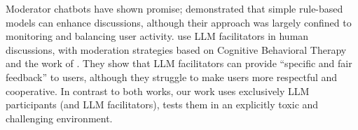 Moderator chatbots have shown promise; \citet{kim_et_al_chatbot} demonstrated that simple rule-based models can enhance discussions, although their approach was largely confined to monitoring and balancing user activity. \citet{cho-etal-2024-language} use \ac{LLM} facilitators in human discussions, with moderation strategies based on Cognitive Behavioral Therapy and the work of \citet{rosenberg2015nonviolent}. They show that \ac{LLM} facilitators can provide “specific and fair feedback” to users, although they struggle to make users more respectful and cooperative.  In contrast to both works, our work uses exclusively \ac{LLM} participants (and \ac{LLM} facilitators), tests them in an explicitly toxic and challenging environment. %
